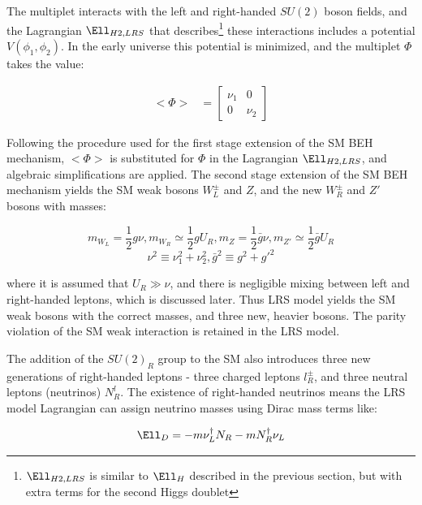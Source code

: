 The multiplet interacts with the left and right-handed $SU(2)$ boson fields, and the Lagrangian $\Ell_{H2,LRS}$ that 
describes\footnote{$\Ell_{H2,LRS}$ is similar to $\Ell_{H}$ described in the previous section, but with extra terms for the second Higgs doublet} these 
interactions includes a potential $V(\phi_{1},\phi_{2})$.  In the early universe this potential is minimized, and 
the multiplet $\Phi$ takes the value:

\begin{align}
	<\Phi> &= \begin{bmatrix}
	\nu_{1} & 0 \\
	0 & \nu_{2}
	\end{bmatrix}
	\label{eq:stageTwoVEV}
\end{align}

Following the procedure used for the first stage extension of the SM BEH mechanism, $<\Phi>$ is substituted for $\Phi$ in 
the Lagrangian $\Ell_{H2,LRS}$, and algebraic simplifications are applied.  The second stage extension of the SM BEH 
mechanism yields the SM weak bosons $W^{\pm}_{L}$ and $Z$, and the new $W^{\pm}_{R}$ and $Z'$ bosons with masses:

\begin{equation}
	m_{W_{L}} = \frac{1}{2}g\nu , m_{W_{R}} \simeq \frac{1}{2}gU_{R} , m_{Z} = \frac{1}{2}\bar{g}\nu , m_{Z'} \simeq \frac{1}{2}\bar{g}U_{R}
\end{equation}
\begin{equation}
	\nu^{2} \equiv \nu^{2}_{1} + \nu^{2}_{2} , \bar{g}^{2} \equiv g^{2} + g'^{2}
\end{equation}



where it is assumed that $U_{R} \gg \nu$, and there is negligible mixing between left and right-handed leptons, 
which is discussed later.  Thus LRS model yields the SM weak bosons with the correct masses, and three new, 
heavier bosons.  The parity violation of the SM weak interaction is retained in the LRS model.

The addition of the $SU(2)_{R}$ group to the SM also introduces three new generations of right-handed leptons - 
three charged leptons $l^{\pm}_{R}$, and three neutral leptons (neutrinos) $N^{l}_{R}$.  The existence of 
right-handed neutrinos means the LRS model Lagrangian can assign neutrino masses using Dirac mass terms like:

\begin{equation}
	\Ell_{D} = -m\nu^{\dagger}_{L}N_{R} - mN^{\dagger}_{R}\nu_{L}
\end{equation}

